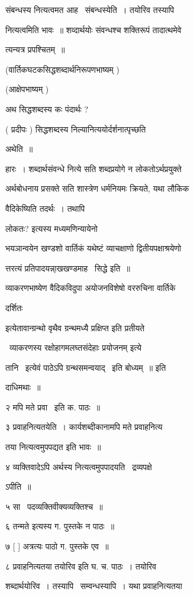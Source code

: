 \documentclass[11pt, openany]{book}
\begin{document}
संबन्धस्य नित्यत्वमत आह \textendash\ संबन्धस्येति~। तयोरिव तस्यापि 

नित्यत्वमिति भावः~॥ शव्दार्थयोः संवन्धश्च शक्तिरूपं तादात्थमेवे \textendash\ 

त्यन्यत्र प्रपश्चितम्~॥ 

(वार्तिकघटकसिद्धशब्दार्थनिरूपणभाष्यम् ) 

(आक्षेपभाष्यम् ) 

अथ सिद्धशब्दस्य कः पंदार्थः ? 

( प्रदीपः ) सिद्धशब्दस्य निल्यानित्ययोर्दर्शनात्पृच्छति \textendash\ 

अथेति~॥ 

हारः~। शब्दार्थसंवन्धे नित्ये सति शब्दप्रयोगे न लोकतोऽर्थप्रयुक्ते \textendash\ 

अर्थबोधनाय प्रसक्ते सति शास्त्रेण धर्मनियमः क्रियते, यथा लौकिक \textendash\ 

वैदिकेष्यिति तदर्थः~। तथापि {\qt लोकतः? इत्यस्य मध्यमणिन्यायेनो \textendash\ 

भयञान्वयेन खण्डशो वार्तिकं यथेष्टं व्याचक्षाणो द्वितीयपक्षाश्रयेणो \textendash\ 

त्तरत्यं प्रतिपादयन्ना्खखण्डमाह \textendash\ सिद्धे इति~॥ 

व्याकरणभाष्येण वैदिकविदुपा अयोजनविशेषो वररुचिना वार्तिके 

दर्शितः} इत्येतावान्ग्रन्थो वृथैव ग्रन्थमध्यै प्रक्षिप्त इति प्रतीयते 

 \textendash\ व्याकरणस्य {\qt रक्षोहागमलघ्तसंदेहाः प्रयोजनम्} इत्ये \textendash\ 

तानि \textendash\ {\qt  इत्येवं पाठेऽपि ग्रन्थसमन्वयाद्} \textendash\ इति बोध्यम्~॥ इति 

दाधिमथाः~॥ 

२ मपि मते प्रवा \textendash\ इति क. पाठः~॥ 

३ प्रवाहनित्यतयेति~। कार्यशब्दीकानामपि मते प्रवाहनित्य \textendash\ 

तया नित्यत्वमुपपद्यत इति भावः~॥ 

४ व्यक्तिवादेऽपि अर्थस्य नित्यत्वमुपपादयति \textendash\ द्रव्यपक्षे \textendash\ 

ऽपीति~॥ 

५ सा \textendash\ पदव्यक्तिवीक्यव्यक्तिश्च~॥ 

६ {\qt तन्मते} इत्यस्य ग. पुस्तके न पाठः~॥ 

७ [ ] अत्रत्यः पाठो ग. पुस्तके एव~॥ 

८ {\qt प्रवाहनित्यतया तयोरिव} इति घ. च. पाठः~। तयोरिव \textendash\ 

शब्दार्थयोरिव~। तस्यापि \textendash\ सम्वन्धस्यापि~। यथा प्रवाहनित्यतया 
\end{document}
